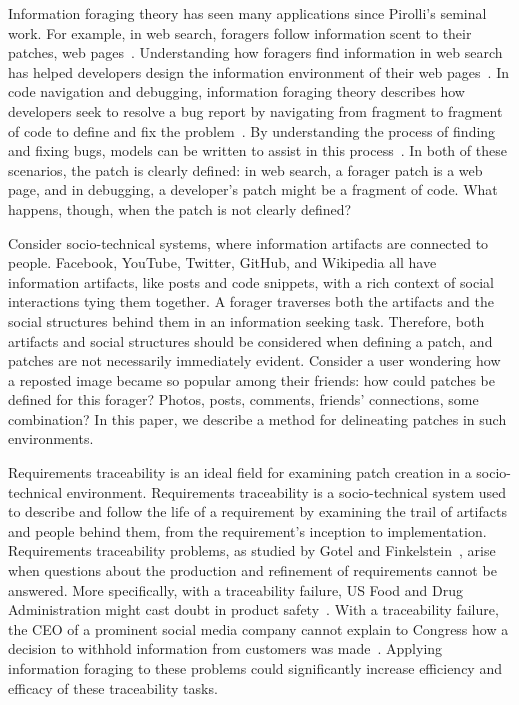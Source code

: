 \documentclass[conference]{IEEEtran}
\begin{document}
Information foraging theory has seen many applications since Pirolli's seminal work. For example, in web search, foragers follow information scent to their patches, web pages~\cite{pirolliWeb,wufis}. Understanding how foragers find information in web search has helped developers design the information environment of their web pages~\cite{wufis}. In code navigation and debugging, information foraging theory describes how developers seek to resolve a bug report by navigating from fragment to fragment of code to define and fix the problem~\cite{navValueCost}.
By understanding the process of finding and fixing bugs, models can be written to assist in this process~\cite{pfisRevisit}. In both of these scenarios, the patch is clearly defined: in web search, a forager patch is a web page, and in debugging, a developer's patch might be a fragment of code. What happens, though, when the patch is not clearly defined?

Consider socio-technical systems, where information artifacts are connected to people. Facebook, YouTube, Twitter, GitHub, and Wikipedia all have information artifacts, like posts and code snippets, with a rich context of social interactions tying them together. A forager traverses both the artifacts and the social structures behind them in an information seeking task. Therefore, both artifacts and social structures should be considered when defining a patch, and patches are not necessarily immediately evident. Consider a user wondering how a reposted image became so popular among their friends: how could patches be defined for this forager? Photos, posts, comments, friends' connections, some combination? In this paper, we describe a method for delineating patches in such environments.

Requirements traceability is an ideal field for examining patch creation in a socio-technical environment. Requirements traceability is a socio-technical system used to describe and follow the life of a requirement by examining the trail of artifacts and people behind them, from the requirement's inception to implementation. Requirements traceability problems, as studied by Gotel and Finkelstein~\cite{ICSE30}, arise when questions about the production and refinement of requirements cannot be answered. More specifically, with a traceability failure, US Food and Drug Administration might cast doubt in product safety~\cite{ICSE46}. With a traceability failure, the CEO of a prominent social media company cannot explain to Congress how a decision to withhold information from customers was made~\cite{politicoFacebook}. Applying information foraging to these problems could significantly increase efficiency and efficacy of these traceability tasks.
\end{document}
